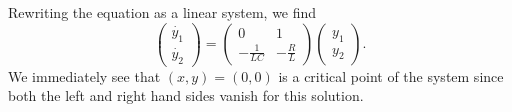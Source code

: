 \documentclass[11pt,a4paper]{article}
\begin{document}
	Rewriting the equation as a linear system, we find
	$$
	\begin{pmatrix}
		\dot{y_1}\\
		\dot{y_2}
	\end{pmatrix}
	=
	\begin{pmatrix}
		0 & 1\\
		-\frac{1}{LC} & -\frac{R}{L}
	\end{pmatrix}
	\begin{pmatrix}
		y_1\\
		y_2
	\end{pmatrix}.
	$$
	We immediately see that $(x, y) = (0, 0)$ is a critical point of the system since both the left and right hand sides vanish for this solution.
\end{document}
